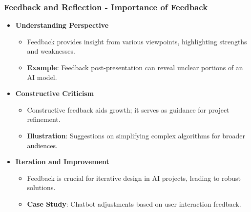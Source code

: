 \documentclass[aspectratio=169]{beamer}
\begin{document}
\begin{frame}[fragile]
    \frametitle{Feedback and Reflection - Importance of Feedback}
    \begin{itemize}
        \item \textbf{Understanding Perspective}
        \begin{itemize}
            \item Feedback provides insight from various viewpoints, highlighting strengths and weaknesses.
            \item \textbf{Example}: Feedback post-presentation can reveal unclear portions of an AI model.
        \end{itemize}
        
        \item \textbf{Constructive Criticism}
        \begin{itemize}
            \item Constructive feedback aids growth; it serves as guidance for project refinement.
            \item \textbf{Illustration}: Suggestions on simplifying complex algorithms for broader audiences.
        \end{itemize}

        \item \textbf{Iteration and Improvement}
        \begin{itemize}
            \item Feedback is crucial for iterative design in AI projects, leading to robust solutions.
            \item \textbf{Case Study}: Chatbot adjustments based on user interaction feedback.
        \end{itemize}
    \end{itemize}
\end{frame}
\end{document}
